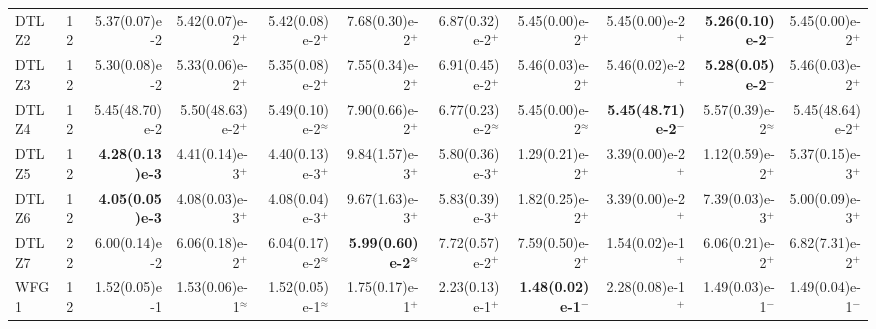 \documentclass[pdflatex,sn-mathphys-ay]{sn-jnl}%
\theoremstyle{thmstyleone}%
\theoremstyle{thmstyletwo}%
\theoremstyle{thmstylethree}%
\begin{document}
\begin{landscape}
{\begin{longtable}{llrrrrrrrrr}
			DTLZ2                             & 12  & 5.37(0.07)e-2          & 5.42(0.07)e-2$^{+}$        & 5.42(0.08)e-2$^{+}$                & 7.68(0.30)e-2$^{+}$                & 6.87(0.32)e-2$^{+}$       & 5.45(0.00)e-2$^{+}$          & 5.45(0.00)e-2$^{+}$           & \textbf{5.26(0.10)e-2}$^{-}$       & 5.45(0.00)e-2$^{+}$          \\
			DTLZ3                             & 12  & 5.30(0.08)e-2          & 5.33(0.06)e-2$^{+}$        & 5.35(0.08)e-2$^{+}$                & 7.55(0.34)e-2$^{+}$                & 6.91(0.45)e-2$^{+}$       & 5.46(0.03)e-2$^{+}$          & 5.46(0.02)e-2$^{+}$           & \textbf{5.28(0.05)e-2}$^{-}$       & 5.46(0.03)e-2$^{+}$          \\
			DTLZ4                             & 12  & 5.45(48.70)e-2         & 5.50(48.63)e-2$^{+}$       & 5.49(0.10)e-2$^{\approx}$          & 7.90(0.66)e-2$^{+}$                & 6.77(0.23)e-2$^{\approx}$ & 5.45(0.00)e-2$^{\approx}$    & \textbf{5.45(48.71)e-2}$^{-}$ & 5.57(0.39)e-2$^{\approx}$          & 5.45(48.64)e-2$^{+}$         \\
			DTLZ5                             & 12  & \textbf{4.28(0.13)e-3} & 4.41(0.14)e-3$^{+}$        & 4.40(0.13)e-3$^{+}$                & 9.84(1.57)e-3$^{+}$                & 5.80(0.36)e-3$^{+}$       & 1.29(0.21)e-2$^{+}$          & 3.39(0.00)e-2$^{+}$           & 1.12(0.59)e-2$^{+}$                & 5.37(0.15)e-3$^{+}$          \\
			DTLZ6                             & 12  & \textbf{4.05(0.05)e-3} & 4.08(0.03)e-3$^{+}$        & 4.08(0.04)e-3$^{+}$                & 9.67(1.63)e-3$^{+}$                & 5.83(0.39)e-3$^{+}$       & 1.82(0.25)e-2$^{+}$          & 3.39(0.00)e-2$^{+}$           & 7.39(0.03)e-3$^{+}$                & 5.00(0.09)e-3$^{+}$          \\
			DTLZ7                             & 22  & 6.00(0.14)e-2          & 6.06(0.18)e-2$^{+}$        & 6.04(0.17)e-2$^{\approx}$          & \textbf{5.99(0.60)e-2}$^{\approx}$ & 7.72(0.57)e-2$^{+}$       & 7.59(0.50)e-2$^{+}$          & 1.54(0.02)e-1$^{+}$           & 6.06(0.21)e-2$^{+}$                & 6.82(7.31)e-2$^{+}$          \\
			\midrule
			WFG1                              & 12  & 1.52(0.05)e-1          & 1.53(0.06)e-1$^{\approx}$  & 1.52(0.05)e-1$^{\approx}$          & 1.75(0.17)e-1$^{+}$                & 2.23(0.13)e-1$^{+}$       & \textbf{1.48(0.02)e-1}$^{-}$ & 2.28(0.08)e-1$^{+}$           & 1.49(0.03)e-1$^{-}$                & 1.49(0.04)e-1$^{-}$          \\

\end{longtable}}
\end{landscape}
\end{document}
